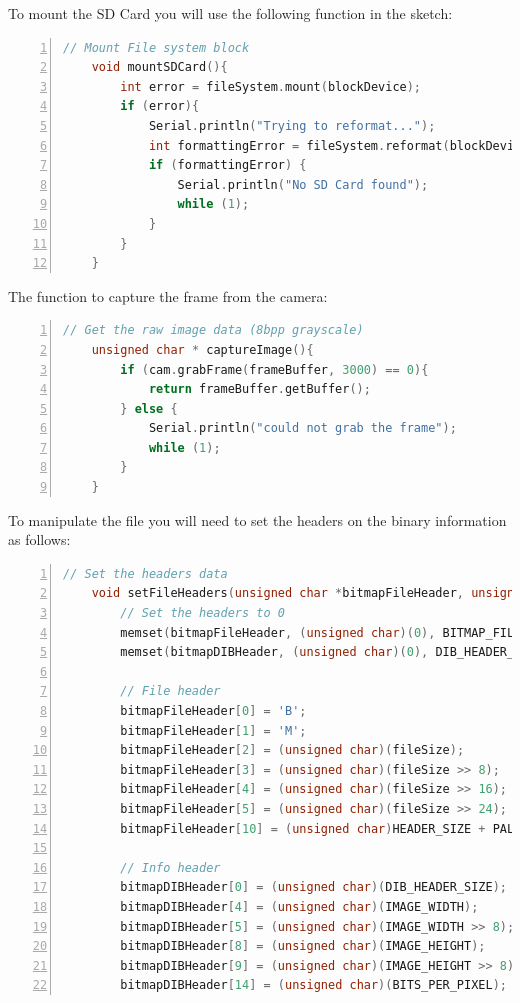 To mount the SD Card you will use the following function in the sketch: \cite{portentaCameraToBitmap:2024}

\begin{lstlisting}[language=C++, frame=single, numbers=left, basicstyle=\ttfamily\small]
	// Mount File system block
	void mountSDCard(){
		int error = fileSystem.mount(blockDevice);
		if (error){
			Serial.println("Trying to reformat...");
			int formattingError = fileSystem.reformat(blockDevice);
			if (formattingError) {            
				Serial.println("No SD Card found");
				while (1);
			}
		}
	}
\end{lstlisting}

The function to capture the frame from the camera: \cite{portentaCameraToBitmap:2024}

\begin{lstlisting}[language=C++, frame=single, numbers=left, basicstyle=\ttfamily\small]
	// Get the raw image data (8bpp grayscale)
	unsigned char * captureImage(){
		if (cam.grabFrame(frameBuffer, 3000) == 0){
			return frameBuffer.getBuffer();
		} else {
			Serial.println("could not grab the frame");
			while (1);
		}
	}
\end{lstlisting}

To manipulate the file you will need to set the headers on the binary information as follows: \cite{portentaCameraToBitmap:2024}

\begin{lstlisting}[language=C++, frame=single, numbers=left, basicstyle=\ttfamily\small]
	// Set the headers data
	void setFileHeaders(unsigned char *bitmapFileHeader, unsigned char *bitmapDIBHeader, int fileSize){
		// Set the headers to 0
		memset(bitmapFileHeader, (unsigned char)(0), BITMAP_FILE_HEADER_SIZE);
		memset(bitmapDIBHeader, (unsigned char)(0), DIB_HEADER_SIZE);
		
		// File header
		bitmapFileHeader[0] = 'B';
		bitmapFileHeader[1] = 'M';
		bitmapFileHeader[2] = (unsigned char)(fileSize);
		bitmapFileHeader[3] = (unsigned char)(fileSize >> 8);
		bitmapFileHeader[4] = (unsigned char)(fileSize >> 16);
		bitmapFileHeader[5] = (unsigned char)(fileSize >> 24);
		bitmapFileHeader[10] = (unsigned char)HEADER_SIZE + PALETTE_SIZE;
		
		// Info header
		bitmapDIBHeader[0] = (unsigned char)(DIB_HEADER_SIZE);
		bitmapDIBHeader[4] = (unsigned char)(IMAGE_WIDTH);
		bitmapDIBHeader[5] = (unsigned char)(IMAGE_WIDTH >> 8);
		bitmapDIBHeader[8] = (unsigned char)(IMAGE_HEIGHT);
		bitmapDIBHeader[9] = (unsigned char)(IMAGE_HEIGHT >> 8);
		bitmapDIBHeader[14] = (unsigned char)(BITS_PER_PIXEL); }
\end{lstlisting}

